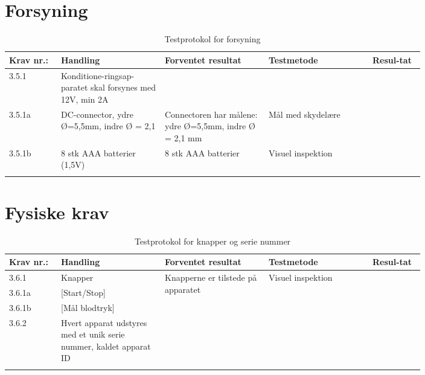 			\section{Forsyning}
				\begin{longtable}{|p{0.1\linewidth}|p{0.2\linewidth}|p{0.2\linewidth}|p{0.2\linewidth}|p{0.1\linewidth}|}
					\hline
					\rowcolor{usDef}
					Krav nr.: & Handling & Forventet resultat & Testmetode & Resul-tat  \\\hline
					3.5.1& Konditione-ringsap-paratet skal forsynes med 12V, min 2A & &  & \\ \hline
					3.5.1a& DC-connector, ydre Ø=5,5mm, indre Ø = 2,1  & Connectoren har målene: ydre Ø=5,5mm, indre Ø = 2,1 mm & Mål med skydelære  & \\ \hline
					3.5.1b& 8 stk AAA batterier (1,5V)  & 8 stk AAA batterier & Visuel inspektion  & \\ \hline
					\caption{Testprotokol for forsyning}
				\end{longtable}
			
			\section{Fysiske krav}
				\begin{longtable}{|p{0.1\linewidth}|p{0.2\linewidth}|p{0.2\linewidth}|p{0.2\linewidth}|p{0.1\linewidth}|}
					\hline
					\rowcolor{usDef}
					Krav nr.: & Handling & Forventet resultat & Testmetode & Resul-tat  \\\hline
					3.6.1& Knapper & \multirow{4}{\linewidth}{Knapperne er tilstede på apparatet}  & \multirow{4}{\linewidth}{Visuel inspektion}  & \multirow{4}{\linewidth}{}  \\ \cline{1-2}
					3.6.1a& [Start/Stop] & &  & \\ \cline{1-2}
					3.6.1b& [Mål blodtryk] & &  & \\ \cline{1-2}
					3.6.2& Hvert apparat udstyres med et unik serie nummer, kaldet apparat ID & &  & \\ \hline
					\caption{Testprotokol for knapper og serie nummer}
				\end{longtable}
				
				\newpage

